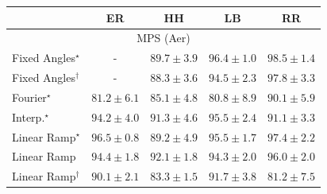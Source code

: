 \begin{tabular}{l|cccc|}
\toprule
            & ER & HH & LB & RR \\
\midrule
\multicolumn{5}{c}{\rule{0pt}{8pt}MPS (Aer)} \\
\midrule
Fixed Angles$^\star$ & {\cellcolor[HTML]{000000}} \color[HTML]{F1F1F1} {\cellcolor{white}} \color{black} - & {\cellcolor[HTML]{8A59A8}} \color[HTML]{F1F1F1} $89.7\pm 3.9$ & {\cellcolor[HTML]{6F0A6B}} \color[HTML]{F1F1F1} $96.4\pm 1.0$ & {\cellcolor[HTML]{4F004D}} \color[HTML]{F1F1F1} $98.5\pm 1.4$ \\
Fixed Angles$^\dagger$ & {\cellcolor[HTML]{000000}} \color[HTML]{F1F1F1} {\cellcolor{white}} \color{black} - & {\cellcolor[HTML]{8C6AB1}} \color[HTML]{F1F1F1} $88.3\pm 3.6$ & {\cellcolor[HTML]{821982}} \color[HTML]{F1F1F1} $94.5\pm 2.3$ & {\cellcolor[HTML]{5A0457}} \color[HTML]{F1F1F1} $97.8\pm 3.3$ \\
Fourier$^\star$ & {\cellcolor[HTML]{9FBCDA}} \color[HTML]{000000} $81.2\pm 6.1$ & {\cellcolor[HTML]{8C91C4}} \color[HTML]{F1F1F1} $85.1\pm 4.8$ & {\cellcolor[HTML]{A3BFDC}} \color[HTML]{000000} $80.8\pm 8.9$ & {\cellcolor[HTML]{8A54A6}} \color[HTML]{F1F1F1} $90.1\pm 5.9$ \\
Interp.$^\star$ & {\cellcolor[HTML]{831D85}} \color[HTML]{F1F1F1} $94.2\pm 4.0$ & {\cellcolor[HTML]{88459F}} \color[HTML]{F1F1F1} $91.3\pm 4.6$ & {\cellcolor[HTML]{7C0E78}} \color[HTML]{F1F1F1} $95.5\pm 2.4$ & {\cellcolor[HTML]{8948A0}} \color[HTML]{F1F1F1} $91.1\pm 3.3$ \\
Linear Ramp$^\star$ & {\cellcolor[HTML]{6E096A}} \color[HTML]{F1F1F1} $96.5\pm 0.8$ & {\cellcolor[HTML]{8B60AC}} \color[HTML]{F1F1F1} $89.2\pm 4.9$ & {\cellcolor[HTML]{7C0E78}} \color[HTML]{F1F1F1} $95.5\pm 1.7$ & {\cellcolor[HTML]{5F055C}} \color[HTML]{F1F1F1} $97.4\pm 2.2$ \\
Linear Ramp & {\cellcolor[HTML]{831A83}} \color[HTML]{F1F1F1} $94.4\pm 1.8$ & {\cellcolor[HTML]{873B99}} \color[HTML]{F1F1F1} $92.1\pm 1.8$ & {\cellcolor[HTML]{831C84}} \color[HTML]{F1F1F1} $94.3\pm 2.0$ & {\cellcolor[HTML]{740B70}} \color[HTML]{F1F1F1} $96.0\pm 2.0$ \\
Linear Ramp$^\dagger$ & {\cellcolor[HTML]{8A54A6}} \color[HTML]{F1F1F1} $90.1\pm 2.1$ & {\cellcolor[HTML]{94A6CE}} \color[HTML]{F1F1F1} $83.3\pm 1.5$ & {\cellcolor[HTML]{88419D}} \color[HTML]{F1F1F1} $91.7\pm 3.8$ & {\cellcolor[HTML]{9FBCDA}} \color[HTML]{000000} $81.2\pm 7.5$ \\

\end{tabular}
